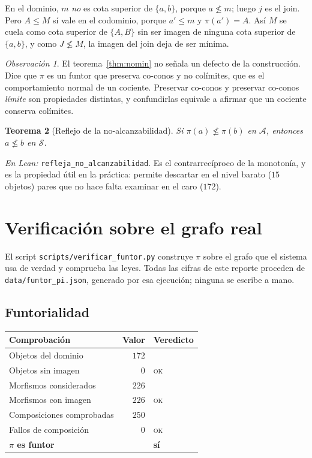 \documentclass[11pt,a4paper]{article}
\theoremstyle{plain}
\newtheorem{teorema}{Teorema}[section]
\theoremstyle{definition}
\theoremstyle{remark}
\newtheorem{observacion}[teorema]{Observación}
\newcommand{\Skills}{\mathcal{S}}
\newcommand{\Agentes}{\mathcal{A}}
\begin{document}
En el dominio, $m$ \emph{no} es cota superior de $\{a,b\}$, porque
$a\not\le m$; luego $j$ es el join. Pero $A\le M$ sí vale en el codominio,
porque $a'\le m$ y $\pi(a')=A$. Así $M$ se cuela como cota superior de $\{A,B\}$
sin ser imagen de ninguna cota superior de $\{a,b\}$, y como $J\not\le M$, la
imagen del join deja de ser mínima.

\begin{observacion}
El teorema~\ref{thm:nomin} no señala un defecto de la construcción. Dice que
$\pi$ es un funtor que preserva co-conos y no colímites, que es el
comportamiento normal de un cociente. Preservar co-conos y preservar co-conos
\emph{límite} son propiedades distintas, y confundirlas equivale a afirmar que
un cociente conserva colímites.
\end{observacion}

\begin{teorema}[Reflejo de la no-alcanzabilidad]
Si $\pi(a)\not\le\pi(b)$ en $\Agentes$, entonces $a\not\le b$ en $\Skills$.
\end{teorema}

\noindent\emph{En Lean:} \texttt{refleja\_no\_alcanzabilidad}. Es el
contrarrecíproco de la monotonía, y es la propiedad útil en la práctica:
permite descartar en el nivel barato ($15$ objetos) pares que no hace falta
examinar en el caro ($172$).

\section{Verificación sobre el grafo real}

El script \texttt{scripts/verificar\_funtor.py} construye $\pi$ sobre el grafo
que el sistema usa de verdad y comprueba las leyes. Todas las cifras de este
reporte proceden de \texttt{data/funtor\_pi.json}, generado por esa ejecución;
ninguna se escribe a mano.

\subsection{Funtorialidad}

\begin{center}
\begin{tabular}{lrl}
\toprule
Comprobación & Valor & Veredicto \\
\midrule
Objetos del dominio & $172$ & \\
Objetos sin imagen & $0$ & \textsc{ok} \\
Morfismos considerados & $226$ & \\
Morfismos con imagen & $226$ & \textsc{ok} \\
Composiciones comprobadas & $250$ & \\
Fallos de composición & $0$ & \textsc{ok} \\
\midrule
\multicolumn{2}{l}{\textbf{$\pi$ es funtor}} & \textbf{sí} \\
\bottomrule
\end{tabular}
\end{center}
\end{document}
